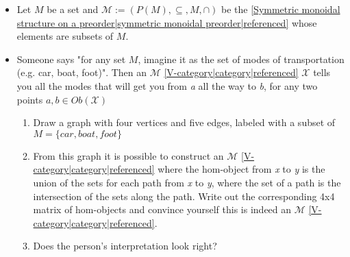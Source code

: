 
\begin{itemize}
    \item Let $M$ be a set and $\mathcal{M}:=(P(M),\subseteq, M, \cap)$ be the \ref{Symmetric monoidal structure on a preorder|symmetric monoidal preorder|referenced} whose elements are subsets of $M$.
    \item Someone says "for any set $M$, imagine it as the set of modes of transportation (e.g. car, boat, foot)". Then an $\mathcal{M}$ \ref{V-category|category|referenced} $\mathcal{X}$ tells you all the modes that will get you from \emph{a} all the way to \emph{b}, for any two points $a,b \in Ob(\mathcal{X})$
          \begin{enumerate}
            \item Draw a graph with four vertices and five edges, labeled with a subset of $M=\{car,boat,foot\}$
            \item From this graph it is possible to construct an $\mathcal{M}$ \ref{V-category|category|referenced} where the hom-object from \emph{x} to \emph{y} is the union of the sets for each path from \emph{x} to \emph{y}, where the set of a path is the intersection of the sets along the path. Write out the corresponding 4x4 matrix of hom-objects and convince yourself this is indeed an $\mathcal{M}$ \ref{V-category|category|referenced}.
            \item Does the person's interpretation look right?
          \end{enumerate}
  \end{itemize}